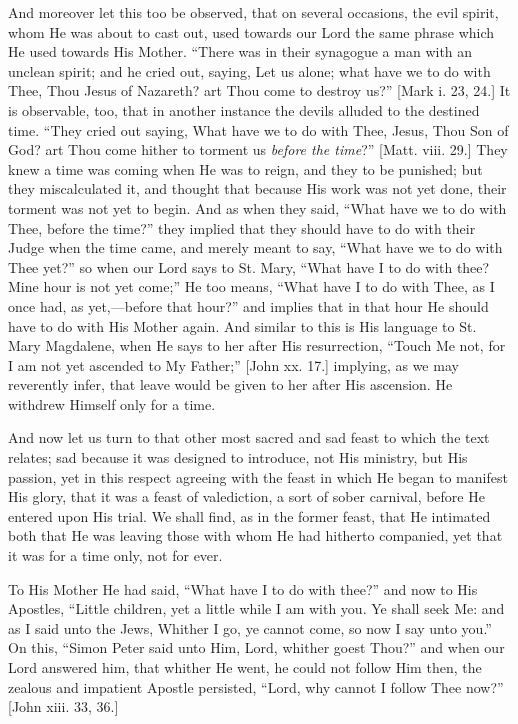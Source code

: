And moreover let this too be observed, that on several occasions,
the evil spirit, whom He was about to cast out, used towards our Lord
the same phrase which He used towards His Mother. ``There was in
their synagogue a man with an unclean spirit; and he cried out,
saying, Let us alone; what have we to do with Thee, Thou Jesus of
Nazareth? art Thou come to destroy us?'' [Mark i. 23, 24.] It is
observable, too, that in another instance the devils alluded to the
destined time. ``They cried out saying, What have we to do with
Thee, Jesus, Thou Son of God? art Thou come hither to torment us \emph{before
the time}?'' [Matt. viii. 29.] They knew a time was coming when
He was to reign, and they to be punished; but they miscalculated it,
and thought that because His work was not yet done, their torment was
not yet to begin. And as when they said, ``What have we to do with
Thee, before the time?'' they implied that they should have to do
with their Judge when the time came, and merely meant to say,
``What have we to do with Thee yet?'' so when our Lord says to
St. Mary, ``What have I to do with thee? Mine hour is not yet come;'' He
too means, ``What have I to do with Thee, as I once had, as yet,—before
that hour?'' and implies that in that hour He should have to do
with His Mother again. And similar to this is His language to St. Mary
Magdalene, when He says to her after His resurrection, ``Touch Me
not, for I am not yet ascended to My Father;'' [John xx. 17.]
implying, as we may reverently infer, that leave would be given to her
after His ascension. He withdrew Himself only for a time.

And now let us turn to that other most sacred and sad feast to
which the text relates; sad because it was designed to introduce, not
His ministry, but His passion, yet in this respect agreeing with the
feast in which He began to manifest His glory, that it was a feast of
valediction, a sort of sober carnival, before He entered upon His
trial. We shall find, as in the former feast, that He intimated both
that He was leaving those with whom He had hitherto companied, yet
that it was for a time only, not for ever.

To His Mother He had said, ``What have I to do with thee?''
and now to His Apostles, ``Little children, yet a little while I
am with you. Ye shall seek Me: and as I said unto the Jews, Whither I
go, ye cannot come, so now I say unto you.'' On this, ``Simon
Peter said unto Him, Lord, whither goest Thou?'' and when our Lord
answered him, that whither He went, he could not follow Him then, the
zealous and impatient Apostle persisted, ``Lord, why cannot I
follow Thee now?'' [John xiii. 33, 36.]

